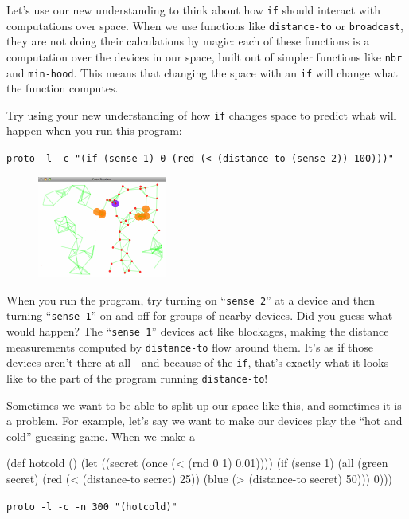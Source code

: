 \documentclass{article}
\newcommand\code[1]{\begin{center}\var{#1}\end{center}}
\newcommand\var[1]{{\tt #1}}
\newcommand\qvar[1]{``{\tt #1}''}
\begin{document}
Let's use our new understanding to think about how \var{if} should
interact with computations over space.  When we use functions like
\var{distance-to} or \var{broadcast}, they are not doing their
calculations by magic: each of these functions is a computation over
the devices in our space, built out of simpler functions like
\var{nbr} and \var{min-hood}.  This means that changing the space with
an \var{if} will change what the function computes.

Try using your new understanding of how \var{if} changes space
to predict what will happen when you run this program:

\code{proto -l -c "(if (sense 1) 0 (red (< (distance-to (sense 2)) 100)))"}

\begin{figure}
  \vspace{-0.8cm}
  \includegraphics[width=0.38\textwidth]{figures/blocked-distance.png}
  \caption{}
  \vspace{-0.5cm}
  \label{f:blockdist}
\end{figure}

When you run the program, try turning on \qvar{sense 2} at a device
and then turning \qvar{sense 1} on and off for groups of nearby
devices.  Did you guess what would happen?  The \qvar{sense 1} devices
act like blockages, making the distance measurements computed by
\var{distance-to} flow around them.  It's as if those devices aren't
there at all---and because of the \var{if}, that's exactly what
it looks like to the part of the program running \var{distance-to}!

Sometimes we want to be able to split up our space like this, and
sometimes it is a problem.  For example, let's say we want to make
our devices play the ``hot and cold'' guessing game.  When we make a 

(def hotcold ()
  (let ((secret (once (< (rnd 0 1) 0.01))))
    (if (sense 1)
      (all (green secret)
           (red (< (distance-to secret) 25))
           (blue (> (distance-to secret) 50)))
      0)))

\code{proto -l -c -n 300 "(hotcold)"}
\end{document}
